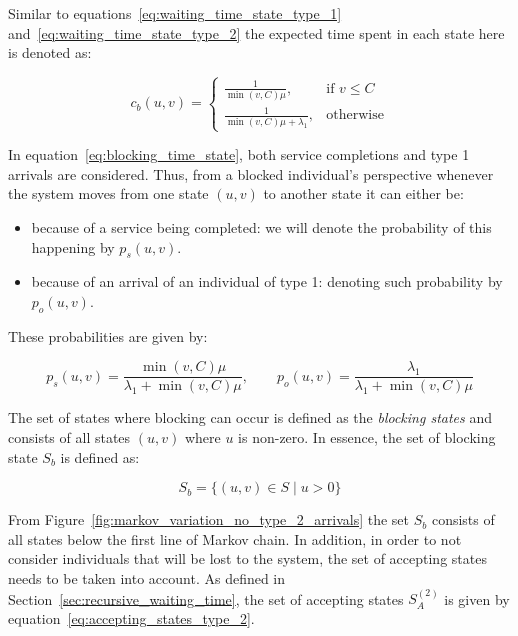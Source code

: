 Similar to equations~\eqref{eq:waiting_time_state_type_1}
and~\eqref{eq:waiting_time_state_type_2} the expected time spent in each state
here is denoted as:

\begin{equation}\label{eq:blocking_time_state}
    c_b(u,v) =
    \begin{cases}
        \frac{1}{\min(v,C) \mu}, & \text{if } v \leq C\\
        \frac{1}{\min(v,C) \mu + \lambda_1}, & \text{otherwise}
    \end{cases}
\end{equation}

In equation~\eqref{eq:blocking_time_state}, both service completions and
type 1 arrivals are considered.
Thus, from a blocked individual's perspective whenever the system moves from one
state \((u,v)\) to another state it can either be:

\begin{itemize}
    \item because of a service being completed: we will denote the
    probability of this happening by \(p_s(u,v)\).
    \item because of an arrival of an individual of type 1: denoting such
    probability by \(p_o(u,v)\).
\end{itemize}

These probabilities are given by:

\begin{equation}\label{eq:blocking_time_probs}
    p_s(u,v) = \frac{\min(v,C)\mu}{\lambda_1 + \min(v,C)\mu}, \qquad
    p_o(u,v) = \frac{\lambda_1}{\lambda_1 + \min(v,C)\mu}
\end{equation}




The set of states where blocking can occur is defined as the \textit{blocking
states} and consists of all states \((u,v)\) where \(u\) is non-zero.
In essence, the set of blocking state \(S_b\) is defined as:

\begin{equation}\label{eq:blocking_states}
    S_b = \{(u,v) \in S \; | \; u > 0\}
\end{equation}

From Figure~\ref{fig:markov_variation_no_type_2_arrivals} the set \(S_b\)
consists of all states below the first line of Markov chain.
In addition, in order to not consider individuals that will be lost to the
system, the set of accepting states needs to be taken into account.
As defined in Section~\ref{sec:recursive_waiting_time}, the set of accepting
states \(S_A^{(2)}\) is given by equation~\eqref{eq:accepting_states_type_2}.

